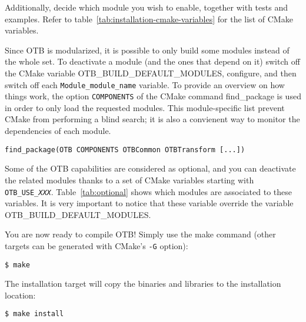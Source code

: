 Additionally, decide which module you wish to enable, together with tests and examples.
Refer to table~\ref{tab:installation-cmake-variables} for the list of CMake variables.

Since OTB is modularized, it is possible to only build some modules instead of the whole set. 
To deactivate a module (and the ones that depend on it) switch off the CMake variable OTB\_BUILD\_DEFAULT\_MODULES,
configure, and then switch off each \texttt{Module\_module\_name} variable.
To provide an overview on how things work, the option \texttt{COMPONENTS} of the CMake command find\_package is used in
order to only load the requested modules.
This module-specific list prevent CMake from performing a blind search; it is also a convienent way to monitor the
dependencies of each module.
\begin{verbatim}
find_package(OTB COMPONENTS OTBCommon OTBTransform [...])
\end{verbatim} 

Some of the OTB capabilities are considered as optional, and you can deactivate the related modules thanks to a set of
CMake variables starting with \texttt{OTB\_USE\_\textit{XXX}}.
Table~\ref{tab:optional} shows which modules are associated to these variables. It is very important to notice that
these variable override the variable OTB\_BUILD\_DEFAULT\_MODULES.

You are now ready to compile OTB!
Simply use the make command (other targets can be generated with CMake's \texttt{-G} option):
\begin{verbatim}
$ make
\end{verbatim}

The installation target will copy the binaries and libraries to the installation location:
\begin{verbatim}
$ make install
\end{verbatim}

